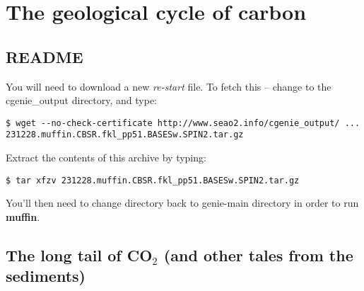 
\cleardoublepage


\chapter{The geological cycle of carbon}\label{ch:geological-carbon}

\hfill \break

\vspace{24mm}

\noindent

\newpage

\section*{README}

You will need to download a new \textit{re-start} file. To fetch this -- change to the \textsf{\footnotesize cgenie\_output directory}, and type:
\vspace{-1mm}\small\begin{verbatim}
$ wget --no-check-certificate http://www.seao2.info/cgenie_output/ ...
231228.muffin.CBSR.fkl_pp51.BASESw.SPIN2.tar.gz
\end{verbatim}\normalsize\vspace{-1mm}
\noindent Extract the contents of this archive by typing:
\vspace{-1mm}\small\begin{verbatim}
$ tar xfzv 231228.muffin.CBSR.fkl_pp51.BASESw.SPIN2.tar.gz
\end{verbatim}\normalsize\vspace{-1mm}
You’ll then need to change directory back to \textsf{\footnotesize genie-main } directory in order to run \textbf{muffin}.

\newpage

\section{The long tail of CO$_{2}$ (and other tales from the sediments)}

